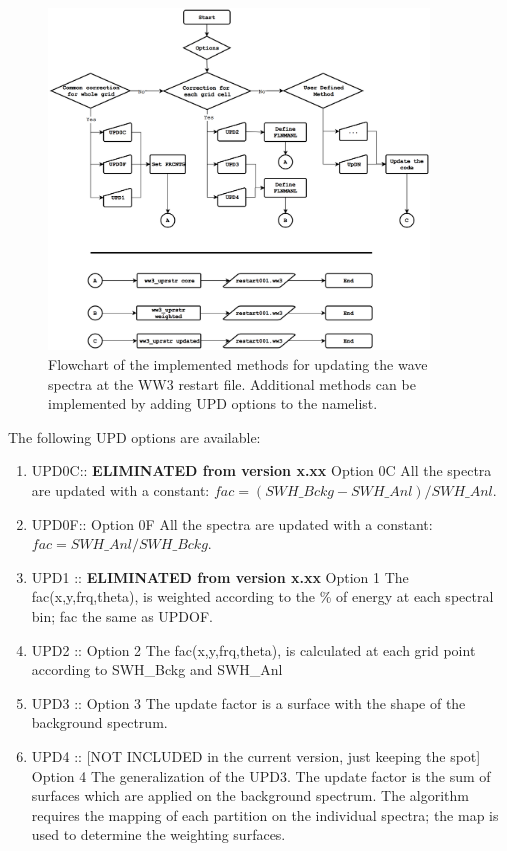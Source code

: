 \begin{figure} \begin{center}
\includegraphics[width=0.9\textwidth]{./run/uprstr.eps}
\caption{Flowchart of the implemented methods for updating the wave spectra at the WW3 
restart file. Additional methods can be implemented by adding UPD options to the namelist.}
\label{fig:uprstrflowchart} \botline
\end{center}
\end{figure}

The following UPD options are available:
\begin{enumerate} 
   \item UPD0C:: \textbf{ELIMINATED from version x.xx} Option 0C  All the spectra are 
   updated with a constant: \newline
      \(fac=(SWH\_Bckg-SWH\_Anl)/SWH\_Anl \).
   \item UPD0F:: Option 0F  All the spectra are updated with a constant: \newline 
      \(fac=SWH\_Anl/SWH\_Bckg \).
   \item UPD1 ::  \textbf{ELIMINATED from version x.xx} Option 1  The fac(x,y,frq,theta), 
   is weighted according to the \% of energy at each spectral bin; fac the same as UPDOF.
   \item UPD2 :: Option 2   The fac(x,y,frq,theta), is calculated at each grid point 
   according to SWH\_Bckg and SWH\_Anl
   \item UPD3 :: Option 3   The update factor is a surface with the shape of 
   the background spectrum. 
   \item UPD4 :: [NOT INCLUDED in the current version, just keeping the spot]
   Option 4  The generalization of the UPD3. The update factor is the sum of surfaces 
   which are applied on the background spectrum. The algorithm requires the mapping 
   of each partition on the individual spectra; the map is used to determine the weighting 
   surfaces.
\end{enumerate}

